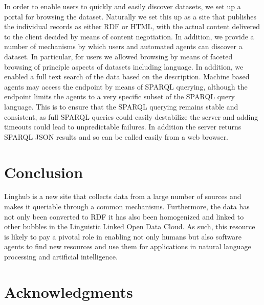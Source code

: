 \documentclass[11pt]{article}
\begin{document}
In order to enable users to quickly and easily discover datasets, we set up a 
portal for browsing the dataset. Naturally we set this up as a site that publishes
the individual records as either RDF or HTML, with the actual content delivered
to the client decided by means of content negotiation. In addition, we provide a 
number of mechanisms by which users and automated agents can discover a dataset. 
In particular, for users we allowed browsing by means of faceted browsing of 
principle aspects of datasets including language. In addition, we enabled a full
text search of the data based on the description. Machine based agents may access
the endpoint by means of SPARQL querying, although the endpoint limits the agents
to a very specific subset of the SPARQL query language. This is to ensure that 
the SPARQL querying remains stable and consistent, as full SPARQL queries could
easily destabilize the server and adding timeouts could lead to unpredictable
failures. In addition the server returns SPARQL JSON results and so can be called
easily from a web browser.


\section{Conclusion}

Linghub is a new site that collects data from a large number of sources and
makes it queriable through a common mechanisms. Furthermore, the data has not
only been converted to RDF it has also been homogenized and linked to other
bubbles in the Linguistic Linked Open Data Cloud. As such, this resource is
likely to pay a pivotal role in enabling not only humans but also software
agents to find new resources and use them for applications in natural language
processing and artificial intelligence.

\section*{Acknowledgments}

%



\end{document}

